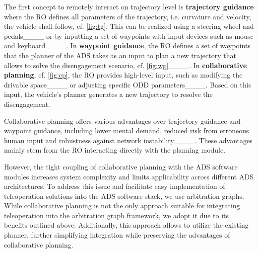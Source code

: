 The first concept to remotely interact on trajectory level is \textbf{trajectory guidance} where the \gls{RO} defines all parameters of the trajectory, i.e. curvature and velocity, the vehicle shall follow, cf. \cref{fig:tg}.
This can be realized using a steering wheel and pedals____ or by inputting a set of waypoints with input devices such as mouse and keyboard____. 
In \textbf{waypoint guidance}, the \gls{RO} defines a set of waypoints that the planner of the \gls{ADS} takes as an input to plan a new trajectory that allows to solve the disengagement scenario, cf. \cref{fig:wg}____.
In \textbf{collaborative planning}, cf. \cref{fig:cp}, the \gls{RO} provides high-level input, such as modifying the drivable space____ or adjusting specific ODD parameters____. Based on this input, the vehicle's planner generates a new trajectory to resolve the disengagement.

Collaborative planning offers various advantages over trajectory guidance and waypoint guidance, including lower mental demand, reduced risk from erroneous human input and robustness against network instability____.
These advantages mainly stem from the \gls{RO} interacting directly with the planning module. 
%

%
%
%

%
%
%
%

However, the tight coupling of collaborative planning with the \gls{ADS} software modules increases system complexity and limits applicability across different \gls{ADS} architectures. 
To address this issue and facilitate easy implementation of teleoperation solutions into the \gls{ADS} software stack, we use arbitration graphs.
While collaborative planning is not the only approach suitable for integrating teleoperation into the arbitration graph framework, we adopt it due to its benefits outlined above. 
Additionally, this approach allows to utilize the existing planner, further simplifying integration while preserving the advantages of collaborative planning.
%
%